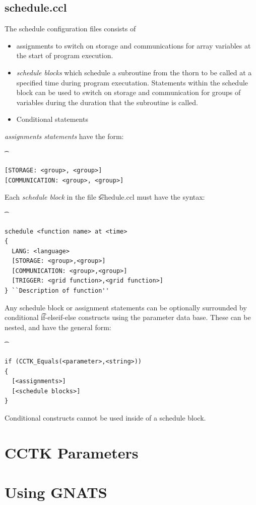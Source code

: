 \section{schedule.ccl}

The schedule configuration files consists of 
\begin{itemize}
\item{} assignments to switch on storage and communications 
        for array variables at the start of program execution.
\item{} {\it schedule blocks} which schedule a subroutine from the
        thorn to be called at a specified time during program 
        executation. Statements within the schedule block can
        be used to switch on storage and communication for groups
        of variables during the duration that the subroutine is called.
\item{} Conditional statements
\end{itemize}

{\it assignments statements} have the form:
{\t
\begin{verbatim}
[STORAGE: <group>, <group>]
[COMMUNICATION: <group>, <group>]
\end{verbatim}
}

Each {\it schedule block} in the file {\t schedule.ccl} must have
the syntax:
{\t
\begin{verbatim}
schedule <function name> at <time>
{
  LANG: <language>
  [STORAGE: <group>,<group>]
  [COMMUNICATION: <group>,<group>]
  [TRIGGER: <grid function>,<grid function>]
} ``Description of function''
\end{verbatim}
}

Any schedule block or assignment statements can be optionally 
surrounded by conditional {\t if-elseif-else}
constructs using the parameter data base. These can be nested,
and have the general form:
{\t
\begin{verbatim}
if (CCTK_Equals(<parameter>,<string>)) 
{
  [<assignments>]
  [<schedule blocks>]
}
\end{verbatim}
}

Conditional constructs cannot be used inside of a schedule block.


\chapter{CCTK Parameters}


\chapter{Using GNATS}

